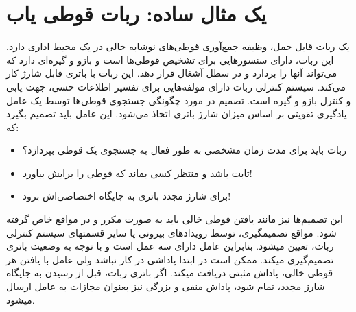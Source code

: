 \section{یک مثال ساده: ربات قوطی یاب}
یک ربات قابل حمل، وظیفه جمع‌آوری قوطی‌های نوشابه خالی در 
یک محیط اداری دارد. این ربات، دارای سنسورهایی برای تشخیص قوطی‌ها است و بازو و گیره‌ای دارد که می‌تواند آن\nf ها را بردارد و در سطل آشغال قرار دهد. این ربات  با باتری قابل شارژ کار می‌کند. سیستم کنترلی ربات
دارای مولفه‌هایی برای تفسیر اطلاعات حسی، جهت یابی و کنترل بازو و گیره است. تصمیم در مورد چگونگی جستجوی قوطی‌ها توسط یک عامل یادگیری تقویتی بر اساس میزان شارژ باتری اتخاذ می‌شود. این عامل باید تصمیم بگیرد که: 
\begin{itemize}
	\item  ربات باید برای مدت زمان مشخصی به طور فعال به جستجوی  یک قوطی بپردازد؟
	\item ثابت باشد و منتظر کسی بماند که قوطی را برایش بیاورد!
	\item  برای شارژ مجدد باتری به جایگاه اختصاصی‌اش  برود!
\end{itemize}
این تصمیم‌ها نیز مانند یافتن قوطی خالی باید به صورت مکرر و در مواقع خاص گرفته شود. مواقع تصمیم\nf گیری، توسط رویدادهای بیرونی یا سایر قسمت\nf های سیستم کنترلی ربات، تعیین می\nf شود. بنابراین عامل
دارای سه عمل است و با توجه به وضعیت باتری تصمیم‌گیری می\nf کند. ممکن است در ابتدا پاداشی در کار نباشد ولی عامل با یافتن هر قوطی خالی،  پاداش مثبتی دریافت می\nf کند. اگر باتری ربات، قبل از رسیدن به جایگاه شارژ مجدد، تمام شود، پاداش منفی و بزرگی نیز بعنوان مجازات به عامل ارسال می\nf شود.


